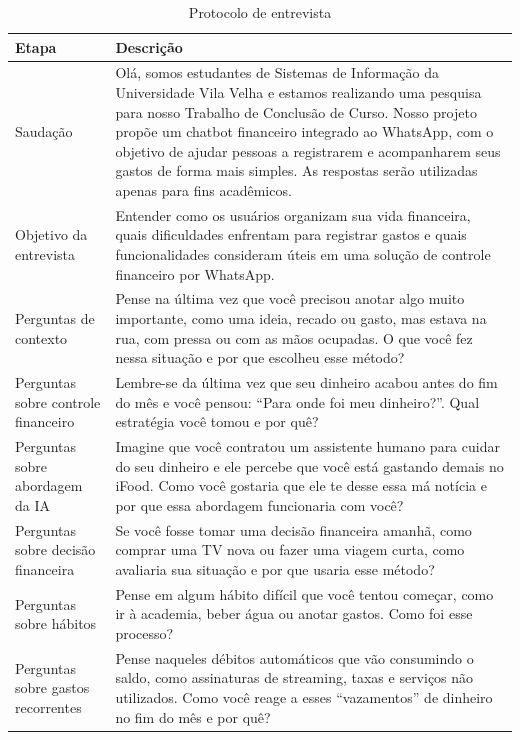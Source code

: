 \begin{table}[H]
    \centering
    \caption{Protocolo de entrevista}
    \label{tab:protocolo-entrevista}
    \begin{tabularx}{\textwidth}{|p{3.8cm}|X|}
        \hline
        \textbf{Etapa} & \textbf{Descrição} \\
        \hline
        Saudação & Olá, somos estudantes de Sistemas de Informação da Universidade Vila Velha e estamos realizando uma pesquisa para nosso Trabalho de Conclusão de Curso. Nosso projeto propõe um chatbot financeiro integrado ao WhatsApp, com o objetivo de ajudar pessoas a registrarem e acompanharem seus gastos de forma mais simples. As respostas serão utilizadas apenas para fins acadêmicos. \\
        \hline
        Objetivo da entrevista & Entender como os usuários organizam sua vida financeira, quais dificuldades enfrentam para registrar gastos e quais funcionalidades consideram úteis em uma solução de controle financeiro por WhatsApp. \\
        \hline
        Perguntas de contexto & Pense na última vez que você precisou anotar algo muito importante, como uma ideia, recado ou gasto, mas estava na rua, com pressa ou com as mãos ocupadas. O que você fez nessa situação e por que escolheu esse método? \\
        \hline
        Perguntas sobre controle financeiro & Lembre-se da última vez que seu dinheiro acabou antes do fim do mês e você pensou: ``Para onde foi meu dinheiro?''. Qual estratégia você tomou e por quê? \\
        \hline
        Perguntas sobre abordagem da IA & Imagine que você contratou um assistente humano para cuidar do seu dinheiro e ele percebe que você está gastando demais no iFood. Como você gostaria que ele te desse essa má notícia e por que essa abordagem funcionaria com você? \\
        \hline
        Perguntas sobre decisão financeira & Se você fosse tomar uma decisão financeira amanhã, como comprar uma TV nova ou fazer uma viagem curta, como avaliaria sua situação e por que usaria esse método? \\
        \hline
        Perguntas sobre hábitos & Pense em algum hábito difícil que você tentou começar, como ir à academia, beber água ou anotar gastos. Como foi esse processo? \\
        \hline
        Perguntas sobre gastos recorrentes & Pense naqueles débitos automáticos que vão consumindo o saldo, como assinaturas de streaming, taxas e serviços não utilizados. Como você reage a esses ``vazamentos'' de dinheiro no fim do mês e por quê? \\

\end{tabularx}
\end{table}
